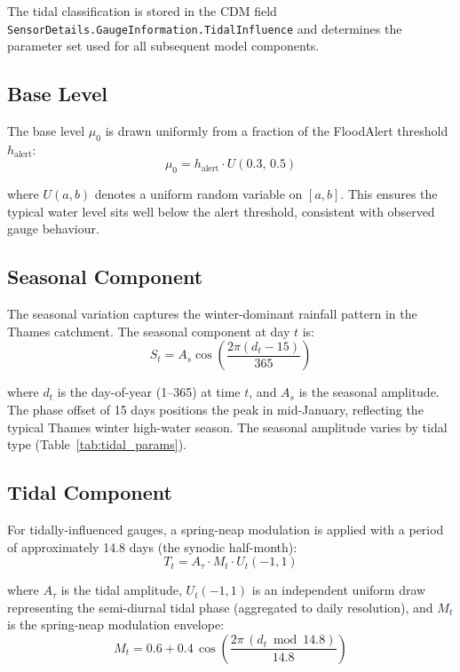 \documentclass[11pt,a4paper]{article}
\begin{document}
The tidal classification is stored in the CDM field
\texttt{SensorDetails.GaugeInformation.TidalInfluence} and determines the parameter set
used for all subsequent model components.

\subsection{Base Level}

The base level $\mu_0$ is drawn uniformly from a fraction of the FloodAlert threshold
$h_{\text{alert}}$:
\begin{equation}
    \mu_0 = h_{\text{alert}} \cdot U(0.3,\, 0.5)
    \label{eq:base_level}
\end{equation}

\noindent where $U(a, b)$ denotes a uniform random variable on $[a, b]$. This ensures the
typical water level sits well below the alert threshold, consistent with observed gauge
behaviour.

\subsection{Seasonal Component}

The seasonal variation captures the winter-dominant rainfall pattern in the Thames
catchment. The seasonal component at day $t$ is:
\begin{equation}
    S_t = A_s \cos\!\left(\frac{2\pi(d_t - 15)}{365}\right)
    \label{eq:seasonal}
\end{equation}

\noindent where $d_t$ is the day-of-year (1--365) at time $t$, and $A_s$ is the
seasonal amplitude. The phase offset of 15 days positions the peak in mid-January,
reflecting the typical Thames winter high-water season. The seasonal amplitude varies
by tidal type (Table~\ref{tab:tidal_params}).

\subsection{Tidal Component}

For tidally-influenced gauges, a spring-neap modulation is applied with a period of
approximately 14.8 days (the synodic half-month):
\begin{equation}
    T_t = A_{\tau} \cdot M_t \cdot U_t(-1, 1)
    \label{eq:tidal}
\end{equation}

\noindent where $A_{\tau}$ is the tidal amplitude, $U_t(-1, 1)$ is an independent
uniform draw representing the semi-diurnal tidal phase (aggregated to daily resolution),
and $M_t$ is the spring-neap modulation envelope:
\begin{equation}
    M_t = 0.6 + 0.4\,\cos\!\left(\frac{2\pi\,(d_t \bmod 14.8)}{14.8}\right)
    \label{eq:spring_neap}
\end{equation}
\end{document}
